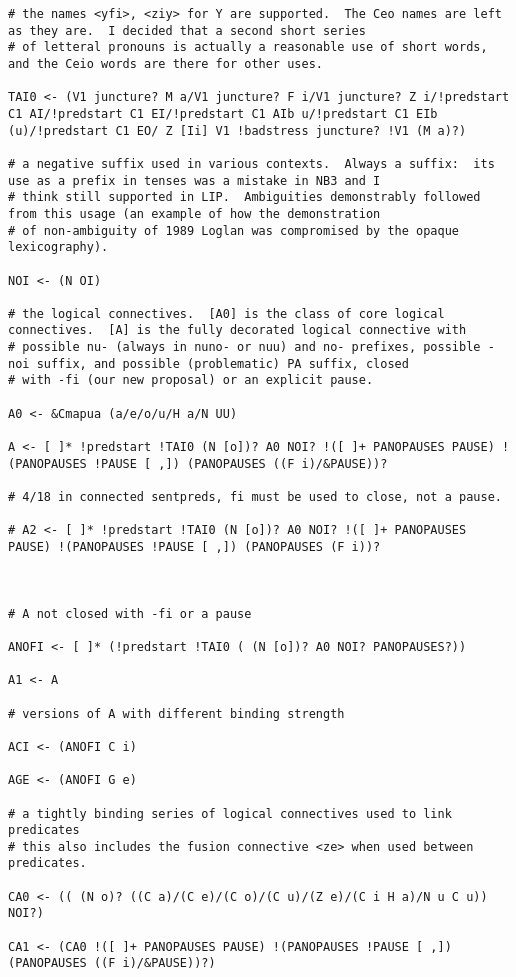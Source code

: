 \documentclass{article}
\begin{document}
\begin{verbatim}
# the names <yfi>, <ziy> for Y are supported.  The Ceo names are left as they are.  I decided that a second short series
# of letteral pronouns is actually a reasonable use of short words, and the Ceio words are there for other uses.

TAI0 <- (V1 juncture? M a/V1 juncture? F i/V1 juncture? Z i/!predstart C1 AI/!predstart C1 EI/!predstart C1 AIb u/!predstart C1 EIb (u)/!predstart C1 EO/ Z [Ii] V1 !badstress juncture? !V1 (M a)?)

# a negative suffix used in various contexts.  Always a suffix:  its use as a prefix in tenses was a mistake in NB3 and I 
# think still supported in LIP.  Ambiguities demonstrably followed from this usage (an example of how the demonstration
# of non-ambiguity of 1989 Loglan was compromised by the opaque lexicography).

NOI <- (N OI)

# the logical connectives.  [A0] is the class of core logical connectives.  [A] is the fully decorated logical connective with
# possible nu- (always in nuno- or nuu) and no- prefixes, possible -noi suffix, and possible (problematic) PA suffix, closed
# with -fi (our new proposal) or an explicit pause.

A0 <- &Cmapua (a/e/o/u/H a/N UU)

A <- [ ]* !predstart !TAI0 (N [o])? A0 NOI? !([ ]+ PANOPAUSES PAUSE) !(PANOPAUSES !PAUSE [ ,]) (PANOPAUSES ((F i)/&PAUSE))?

# 4/18 in connected sentpreds, fi must be used to close, not a pause.

# A2 <- [ ]* !predstart !TAI0 (N [o])? A0 NOI? !([ ]+ PANOPAUSES PAUSE) !(PANOPAUSES !PAUSE [ ,]) (PANOPAUSES (F i))?



# A not closed with -fi or a pause

ANOFI <- [ ]* (!predstart !TAI0 ( (N [o])? A0 NOI? PANOPAUSES?))

A1 <- A

# versions of A with different binding strength

ACI <- (ANOFI C i)

AGE <- (ANOFI G e)

# a tightly binding series of logical connectives used to link predicates
# this also includes the fusion connective <ze> when used between predicates.

CA0 <- (( (N o)? ((C a)/(C e)/(C o)/(C u)/(Z e)/(C i H a)/N u C u)) NOI?)

CA1 <- (CA0 !([ ]+ PANOPAUSES PAUSE) !(PANOPAUSES !PAUSE [ ,]) (PANOPAUSES ((F i)/&PAUSE))?)


\end{verbatim}
\end{document}
